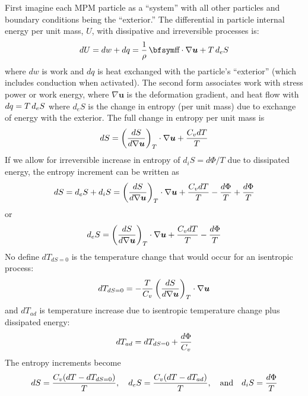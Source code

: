 \documentclass[11pt]{book}
\renewcommand{\vec}[1]{\boldsymbol{#1}}
\def\st{{\hbox{\bfsym\char'033}}}
\begin{document}
First imagine each MPM particle as a ``system'' with all other particles and boundary conditions being the ``exterior.''
The differential in particle internal energy per unit mass, $U$, with dissipative and irreversible processes is:
\begin{equation}%
      dU = dw + dq = {1\over \rho}\thinspace \st\cdot \nabla\vec u + T \thinspace d_eS
\end{equation}%
where $dw$ is work and $dq$ is heat exchanged with the particle's ``exterior'' (which includes conduction when activated). The second form associates work with stress power or work energy, where $\nabla \vec u$ is the deformation gradient, and heat flow with $dq = T \thinspace d_eS$ where $d_eS$ is the change in entropy (per unit mass) due to exchange of energy with the exterior. The full change in entropy per unit mass is
\begin{equation}%
      dS =  \left({dS\over d\nabla\vec u}\right)_T \cdot \nabla\vec u + {C_v dT\over T} 
\end{equation}%
If we allow for irreversible increase in entropy of $d_iS = d\Phi/T$ due to dissipated energy, the entropy increment can be written as
\begin{equation}%
      dS = d_eS + d_iS =  \left({dS\over d\nabla\vec u}\right)_T \cdot \nabla\vec u + {C_v dT\over T}
          - {d\Phi\over T} + {d\Phi\over T}
\end{equation}%
or
\begin{equation}%
      d_eS  =  \left({dS\over d\nabla\vec u}\right)_T \cdot \nabla\vec u + {C_v dT\over T} - {d\Phi\over T} 
\end{equation}%
No define $dT_{dS=0}$ is the temperature change that would occur for an isentropic process:
\begin{equation}%
      dT_{dS=0}  =  - {T\over C_v}\left({dS\over d\nabla\vec u}\right)_T \cdot \nabla\vec u
\end{equation}%
and $dT_{ad}$ is temperature increase due to isentropic temperature change plus dissipated energy:
\begin{equation}%
      dT_{ad}  =  dT_{dS=0} + {d\Phi\over C_v}
\end{equation}%
The entropy increments become
\begin{equation}
     dS = {C_v(dT-dT_{dS=0})\over T}, \quad
     d_eS = {C_v(dT-dT_{ad})\over T}, \quad {\rm and} \quad
     d_iS = {d\Phi\over T}
\end{equation}
\end{document}
